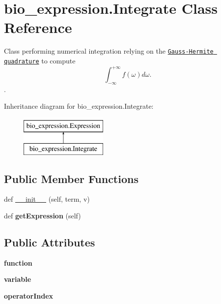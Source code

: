 \hypertarget{classbio__expression_1_1_integrate}{}\section{bio\+\_\+expression.\+Integrate Class Reference}
\label{classbio__expression_1_1_integrate}


Class performing numerical integration relying on the \href{http://en.wikipedia.org/wiki/Gaussian_quadrature}{\tt Gauss-\/\+Hermite quadrature} to compute \[ \int_{-\infty}^{+\infty} f(\omega) d\omega. \].  


Inheritance diagram for bio\+\_\+expression.\+Integrate\+:\begin{figure}[H]
\begin{center}
\leavevmode
\includegraphics[height=2.000000cm]{classbio__expression_1_1_integrate}
\end{center}
\end{figure}
\subsection*{Public Member Functions}
\begin{DoxyCompactItemize}
\item 
def \hyperlink{classbio__expression_1_1_integrate_a5dc316e8b904b50970f8a7d6fe4c4951}{\+\_\+\+\_\+init\+\_\+\+\_\+} (self, term, v)
\item 
def {\bfseries get\+Expression} (self)\hypertarget{classbio__expression_1_1_integrate_a2ede02ab2933e884f6b53c30ce7a3721}{}\label{classbio__expression_1_1_integrate_a2ede02ab2933e884f6b53c30ce7a3721}

\end{DoxyCompactItemize}
\subsection*{Public Attributes}
\begin{DoxyCompactItemize}
\item 
{\bfseries function}\hypertarget{classbio__expression_1_1_integrate_aa0b26e5e7ef188bddbbbac6d2734eb1e}{}\label{classbio__expression_1_1_integrate_aa0b26e5e7ef188bddbbbac6d2734eb1e}

\item 
{\bfseries variable}\hypertarget{classbio__expression_1_1_integrate_a8aa2ae870cce644d72a76ecae5497121}{}\label{classbio__expression_1_1_integrate_a8aa2ae870cce644d72a76ecae5497121}

\item 
{\bfseries operator\+Index}\hypertarget{classbio__expression_1_1_integrate_ae6f4e73d2daf792fc223e12b205c4904}{}\label{classbio__expression_1_1_integrate_ae6f4e73d2daf792fc223e12b205c4904}

\end{DoxyCompactItemize}


